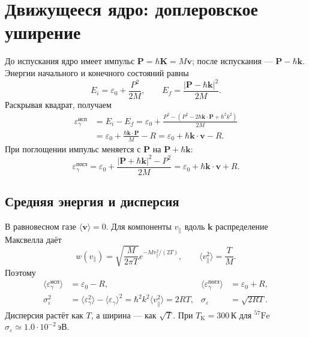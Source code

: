 \documentclass[../final.tex]{subfiles}
\begin{document}
\clearpage
\section{Движущееся ядро: доплеровское уширение}
До испускания ядро имеет импульс $\mathbf P=\hbar\mathbf K=M\mathbf v$;
после испускания --- $\mathbf P-\hbar\mathbf k$.
Энергии начального и конечного состояний равны
\begin{equation*}
 E_i=\varepsilon_0+\frac{P^2}{2M},\qquad
 E_f=\frac{|\mathbf P-\hbar\mathbf k|^2}{2M}.
\end{equation*}
Раскрывая квадрат, получаем
\begin{align*}
 \varepsilon_\gamma^{\text{исп}}&=E_i-E_f
 =\varepsilon_0+\frac{P^2-(P^2-2\hbar\mathbf k\cdot\mathbf P+\hbar^2k^2)}{2M}\\
 &=\varepsilon_0+\frac{\hbar\mathbf k\cdot\mathbf P}{M}-R
 =\varepsilon_0+\hbar\mathbf k\cdot\mathbf v-R.
\end{align*}
При поглощении импульс меняется с $\mathbf P$ на $\mathbf P+\hbar\mathbf k$:
\begin{equation*}
 \varepsilon_\gamma^{\text{погл}}
 =\varepsilon_0+\frac{|\mathbf P+\hbar\mathbf k|^2-P^2}{2M}
 =\varepsilon_0+\hbar\mathbf k\cdot\mathbf v+R.
\end{equation*}

\subsection{Средняя энергия и дисперсия}
В равновесном газе $\langle\mathbf v\rangle=0$.
Для компоненты $v_\parallel$ вдоль $\mathbf k$ распределение Максвелла даёт
\begin{equation*}
 w(v_\parallel)=\sqrt{\frac{M}{2\pi T}}
 e^{-Mv_\parallel^2/(2T)},\qquad
 \langle v_\parallel^2\rangle=\frac TM.
\end{equation*}
Поэтому
\begin{align*}
 \langle\varepsilon_\gamma^{\text{исп}}\rangle&=\varepsilon_0-R,
 &\langle\varepsilon_\gamma^{\text{погл}}\rangle&=\varepsilon_0+R,\\
 \sigma_\varepsilon^2
 &=\langle\varepsilon_\gamma^2\rangle-\langle\varepsilon_\gamma\rangle^2
 =\hbar^2k^2\langle v_\parallel^2\rangle
 =2RT,
 &\sigma_\varepsilon&=\sqrt{2RT}.
\end{align*}
Дисперсия растёт как $T$, а ширина --- как $\sqrt T$.
При $T_{\mathrm K}=300\,\text{К}$ для $^{57}\mathrm{Fe}$
$\sigma_\varepsilon\simeq1.0\cdot10^{-2}\,\text{эВ}$.
\end{document}
